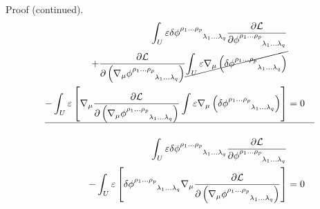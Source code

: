 \documentclass[9pt,handout]{beamer}
\begin{document}
\begin{frame}{}
\begin{block}{Proof (continued).}
\begin{align*}
\int_{U} \varepsilon \delta \phi^{\rho_1 \dots \rho_p}_{\phantom{\rho_1 \dots \rho_p} \lambda_1 \dots \lambda_q} \frac{\partial \mathcal{L}}{\partial \phi^{\rho_1 \dots \rho_p}_{\phantom{\rho_1 \dots \rho_p} \lambda_1 \dots \lambda_q}} \\ 
+ \frac{\partial \mathcal{L}}{\partial \left( \nabla_\mu \phi^{\rho_1 \dots \rho_p}_{\phantom{\rho_1 \dots \rho_p} \lambda_1 \dots \lambda_q} \right)} \cancel{\int_{U} \varepsilon \nabla_\mu \left( \delta \phi^{\rho_1 \dots \rho_p}_{\phantom{\rho_1 \dots \rho_p} \lambda_1 \dots \lambda_q} \right)} \\
- \int_{U} \varepsilon \left[ \nabla_\mu \frac{\partial \mathcal{L}}{\partial \left( \nabla_\mu \phi^{\rho_1 \dots \rho_p}_{\phantom{\rho_1 \dots \rho_p} \lambda_1 \dots \lambda_q} \right)} \int \varepsilon \nabla_\mu \left( \delta \phi^{\rho_1 \dots \rho_p}_{\phantom{\rho_1 \dots \rho_p} \lambda_1 \dots \lambda_q} \right) \right] & = 0 \\
\hline \\
\int_{U} \varepsilon \delta \phi^{\rho_1 \dots \rho_p}_{\phantom{\rho_1 \dots \rho_p} \lambda_1 \dots \lambda_q} \frac{\partial \mathcal{L}}{\partial \phi^{\rho_1 \dots \rho_p}_{\phantom{\rho_1 \dots \rho_p} \lambda_1 \dots \lambda_q}} \\ 
- \int_{U} \varepsilon \left[ \delta \phi^{\rho_1 \dots \rho_p}_{\phantom{\rho_1 \dots \rho_p} \lambda_1 \dots \lambda_q} \nabla_\mu \frac{\partial \mathcal{L}}{\partial \left( \nabla_\mu \phi^{\rho_1 \dots \rho_p}_{\phantom{\rho_1 \dots \rho_p} \lambda_1 \dots \lambda_q} \right)} \right] & = 0 \\
\end{align*}
\end{block}	
\end{frame}
\end{document}
